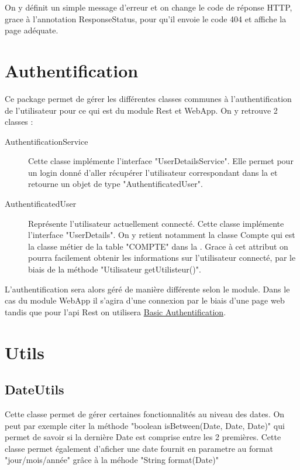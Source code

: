 		On y définit un simple message d'erreur et on change le code de réponse HTTP, grace à l'annotation ResponseStatus, pour qu'il envoie le code 404 et affiche la page adéquate.

	\section{Authentification}

		Ce package permet de gérer les différentes classes communes à l'authentification de l'utilisateur pour ce qui est du module Rest et WebApp. On y retrouve 2 classes :

		\begin{description}
		   \item[AuthentificationService]{Cette classe implémente l'interface "UserDetailsService". Elle permet pour un login donné d'aller récupérer l'utilisateur correspondant dans la \bdd{} et retourne un objet de type "AuthentificatedUser".}
		   \item[AuthentificatedUser]{Représente l'utilisateur actuellement connecté. Cette classe implémente l'interface "UserDetails". On y retient notamment la classe Compte qui est la classe métier de la table "COMPTE" dans la \bdd{}. Grace à cet attribut on pourra facilement obtenir les informations sur l'utilisateur connecté, par le biais de la méthode "Utilisateur getUtilisteur()".}
	   \end{description}

	   L'authentification sera alors géré de manière différente selon le module. Dans le cas du module WebApp il s'agira d'une connexion par le biais d'une page web tandis que pour l'api Rest on utilisera \href{https://fr.wikipedia.org/wiki/Authentification\_HTTP#M%C3%A9thode\_%C2%AB\_Basic\_%C2%BB}{Basic Authentification}.

	\section{Utils}

		\subsection{DateUtils}

			Cette classe permet de gérer certaines fonctionnalités au niveau des dates. On peut par exemple citer la méthode "boolean isBetween(Date, Date, Date)" qui permet de savoir si la dernière Date est comprise entre les 2 premières. Cette classe permet également d'aficher une date fournit en parametre au format "jour/mois/année" grâce à la méhode "String format(Date)"

